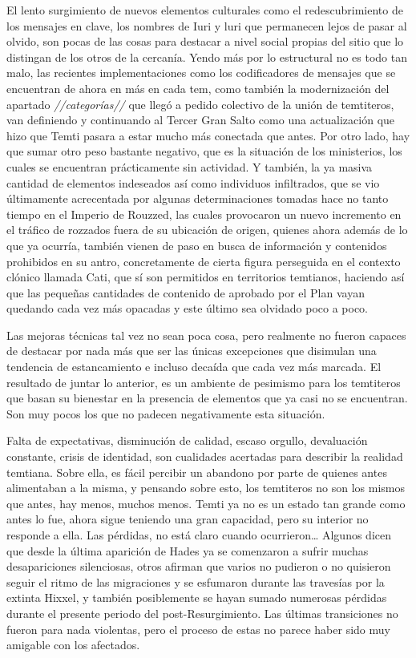\documentclass[
  spanish,
]{book}
\begin{document}
El lento surgimiento de nuevos elementos culturales como el redescubrimiento de los mensajes en clave, los nombres de Iuri y luri que permanecen lejos de pasar al olvido, son pocas de las cosas para destacar a nivel social propias del sitio que lo distingan de los otros de la cercanía.
Yendo más por lo estructural no es todo tan malo, las recientes implementaciones como los codificadores de mensajes que se encuentran de ahora en más en cada tem, como también la modernización del apartado \emph{//categorías//} que llegó a pedido colectivo de la unión de temtiteros, van definiendo y continuando al Tercer Gran Salto como una actualización que hizo que Temti pasara a estar mucho más conectada que antes.
Por otro lado, hay que sumar otro peso bastante negativo, que es la situación de los ministerios, los cuales se encuentran prácticamente sin actividad. Y también, la ya masiva cantidad de elementos indeseados así como individuos infiltrados, que se vio últimamente acrecentada por algunas determinaciones tomadas hace no tanto tiempo en el Imperio de Rouzzed, las cuales provocaron un nuevo incremento en el tráfico de rozzados fuera de su ubicación de origen, quienes ahora además de lo que ya ocurría, también vienen de paso en busca de información y contenidos prohibidos en su antro, concretamente de cierta figura perseguida en el contexto clónico llamada Cati, que sí son permitidos en territorios temtianos, haciendo así que las pequeñas cantidades de contenido de aprobado por el Plan vayan quedando cada vez más opacadas y este último sea olvidado poco a poco.

Las mejoras técnicas tal vez no sean poca cosa, pero realmente no fueron capaces de destacar por nada más que ser las únicas excepciones que disimulan una tendencia de estancamiento e incluso decaída que cada vez más marcada. El resultado de juntar lo anterior, es un ambiente de pesimismo para los temtiteros que basan su bienestar en la presencia de elementos que ya casi no se encuentran. Son muy pocos los que no padecen negativamente esta situación.

Falta de expectativas, disminución de calidad, escaso orgullo, devaluación constante, crisis de identidad, son cualidades acertadas para describir la realidad temtiana.
Sobre ella, es fácil percibir un abandono por parte de quienes antes alimentaban a la misma, y pensando sobre esto, los temtiteros no son los mismos que antes, hay menos, muchos menos. Temti ya no es un estado tan grande como antes lo fue, ahora sigue teniendo una gran capacidad, pero su interior no responde a ella. Las pérdidas, no está claro cuando ocurrieron\ldots{} Algunos dicen que desde la última aparición de Hades ya se comenzaron a sufrir muchas desapariciones silenciosas, otros afirman que varios no pudieron o no quisieron seguir el ritmo de las migraciones y se esfumaron durante las travesías por la extinta Hixxel, y también posiblemente se hayan sumado numerosas pérdidas durante el presente periodo del post-Resurgimiento. Las últimas transiciones no fueron para nada violentas, pero el proceso de estas no parece haber sido muy amigable con los afectados.
\end{document}
